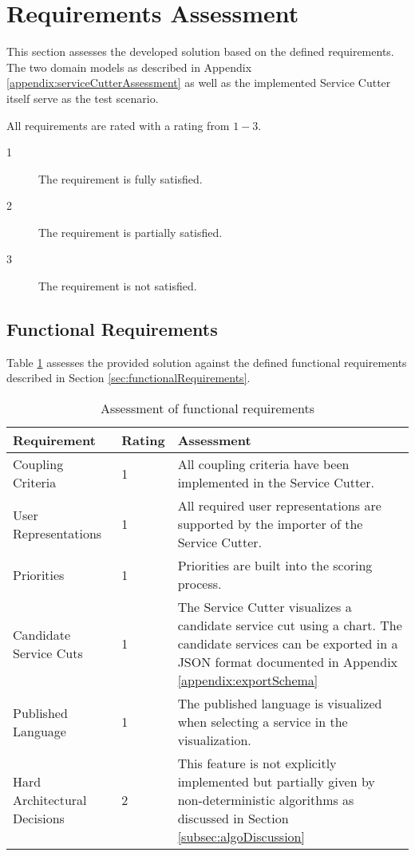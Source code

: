\section{Requirements Assessment}

This section assesses the developed solution based on the defined requirements. The two domain models as described in Appendix \ref{appendix:serviceCutterAssessment} as well as the implemented Service Cutter itself serve as the test scenario.

All requirements are rated with a rating from $1-3$.

\begin{description}
\item[1] The requirement is fully satisfied.
\item[2] The requirement is partially satisfied.
\item[3] The requirement is not satisfied.
\end{description}

\subsection{Functional Requirements}

Table \ref{tab:conclusionFunctional} assesses the provided solution against the defined functional requirements described in Section \ref{sec:functionalRequirements}.

\begin{table}[H]
	\centering
	\caption{Assessment of functional requirements}
	\label{tab:conclusionFunctional}
	\begin{tabular}{|p{100pt}|l|p{250pt}|}
	\hline \textbf{Requirement} & \textbf{Rating} & \textbf{Assessment} \\ 
	\hline Coupling Criteria & 1 & All coupling criteria have been implemented in the Service Cutter.  \\ 
	\hline User Representations & 1 & All required user representations are supported by the importer of the Service Cutter. \\ 
	\hline Priorities & 1 & Priorities are built into the scoring process. \\ 
	\hline Candidate Service Cuts & 1 & The Service Cutter visualizes a candidate service cut using a chart. The candidate services can be exported in a \gls{JSON} format documented in Appendix \ref{appendix:exportSchema} \\ 
	\hline Published Language & 1 & The published language is visualized when selecting a service in the visualization.  \\ 
	\hline Hard Architectural Decisions & 2 & This feature is not explicitly implemented but partially given by non-deterministic algorithms as discussed in Section \ref{subsec:algoDiscussion}\\
	\hline 
	\end{tabular} 
\end{table}

